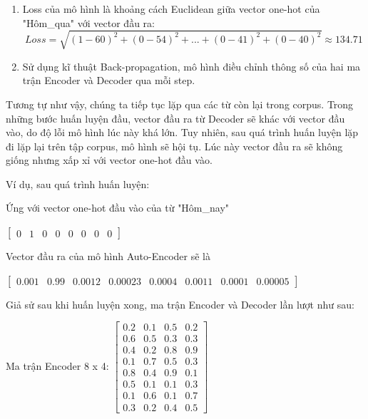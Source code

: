 \begin{enumerate}
    \item Loss của mô hình là khoảng cách Euclidean giữa vector one-hot của "Hôm\_qua" với vector đầu ra:
    \begin{displaymath}
        Loss = \sqrt{(1-60)^2 + (0-54)^2 + ... + (0-41)^2 + (0-40)^2} \approx 134.71
    \end{displaymath}

    \item Sử dụng kĩ thuật Back-propagation, mô hình điều chỉnh thông số của hai ma trận Encoder và Decoder qua mỗi step.
\end{enumerate}

Tương tự như vậy, chúng ta tiếp tục lặp qua các từ còn lại trong corpus. Trong những bước huấn luyện đầu, vector đầu ra từ Decoder sẽ khác với vector đầu vào, do độ lỗi mô hình lúc này khá lớn. Tuy nhiên, sau quá trình huấn luyện lặp đi lặp lại trên tập corpus, mô hình sẽ hội tụ. Lúc này vector đầu ra sẽ không giống nhưng xấp xỉ với vector one-hot đầu vào.

Ví dụ, sau quá trình huấn luyện:

Ứng với vector one-hot đầu vào của từ "Hôm\_nay"
\begin{center}
$\begin{bmatrix}
0 & 1 & 0 & 0 & 0 & 0 & 0 & 0
\end{bmatrix}$
\end{center}

Vector đầu ra của mô hình Auto-Encoder sẽ là
\begin{center}
$\begin{bmatrix}
0.001 & 0.99 & 0.0012 & 0.00023 & 0.0004 & 0.0011 & 0.0001 & 0.00005
\end{bmatrix}$
\end{center}

Giả sử sau khi huấn luyện xong, ma trận Encoder và Decoder lần lượt như sau:

Ma trận Encoder 8 x 4:
$\begin{bmatrix}
 0.2 & 0.1 & 0.5 & 0.2 \\
 0.6 & 0.5 & 0.3 & 0.3 \\
 0.4 & 0.2 & 0.8 & 0.9 \\
 0.1 & 0.7 & 0.5 & 0.3 \\
 0.8 & 0.4 & 0.9 & 0.1 \\
 0.5 & 0.1 & 0.1 & 0.3 \\
 0.1 & 0.6 & 0.1 & 0.7 \\
 0.3 & 0.2 & 0.4 & 0.5
\end{bmatrix}$

